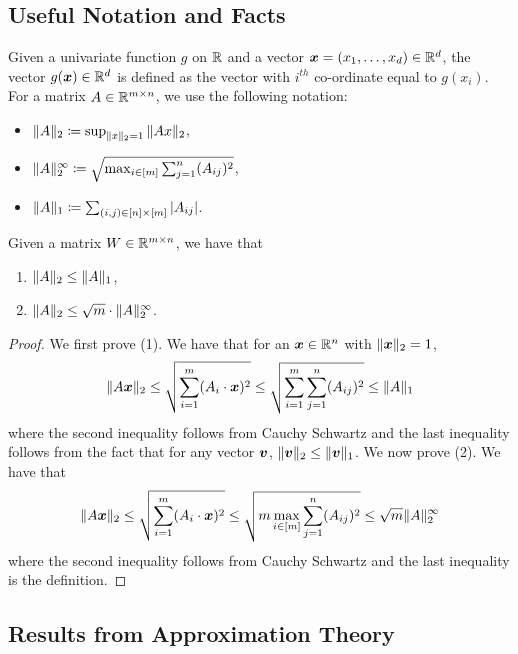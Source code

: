 \subsection{Useful Notation and Facts}
Given a univariate function $g$ on $\mathbb{R}$ and a vector ${\bm{x}}=(x_1,\ldots,x_d)\in \mathbb{R}^{d}$, the vector $g({\bm{x}})\in \mathbb{R}^{d}$ is defined as the vector with $i^{th}$ co-ordinate equal to $g(x_i)$.  For a matrix $A\in \mathbb{R}^{m\times n}$, we use the following notation:
 \begin{itemize}
     \item $\|A\|_{2}\coloneq\sup_{\|x\|_{2}=1}\|Ax\|_{2}$,
     \item $\|A\|_{2}^{\infty}\coloneq\sqrt{\max_{i\in [m]}\sum_{j=1}^{n}(A_{ij})^2}$,
     \item $\|A\|_1\coloneq \sum_{(i,j)\in [n]\times [m]}|A_{ij}|$.
 \end{itemize}
\begin{fact}
\label{fact:matrix_norms}
    Given a matrix $W\in\mathbb{R}^{m\times n}$, we have that 
    \begin{enumerate}
        \item $\|A\|_{2}\leq \|A\|_1$,
        \item $\|A\|_{2}\leq \sqrt{m}\cdot \|A\|_{2}^{\infty}$.
    \end{enumerate}
\end{fact}
\begin{proof}
    We first prove (1). We have that for an ${\bm{x}}\in \mathbb{R}^{n}$ with $\|{\bm{x}}\|_{2}=1$,
    \begin{align*}
        \|A{\bm{x}}\|_{2}\leq \sqrt{\sum_{i=1}^{m}(A_i\cdot {\bm{x}})^2}\leq \sqrt{\sum_{i=1}^{m}\sum_{j=1}^{n}(A_{ij})^2}\leq \|A\|_1
    \end{align*}
    where the second inequality follows from Cauchy Schwartz and the last inequality follows from the fact that for any vector ${\bm{v}}$, $\|{\bm{v}}\|_{2}\leq \|{\bm{v}}\|_1$.
    We now prove (2). We have that 
     \begin{align*}
        \|A{\bm{x}}\|_{2}\leq \sqrt{\sum_{i=1}^{m}(A_i\cdot {\bm{x}})^2}\leq \sqrt{m\max_{i\in [m]}\sum_{j=1}^{n}(A_{ij})^2}\leq \sqrt{m}\|A\|_{2}^{\infty}
    \end{align*} where the second inequality follows from Cauchy Schwartz and the last inequality is the definition. 
\end{proof}

\subsection{Results from Approximation Theory}

